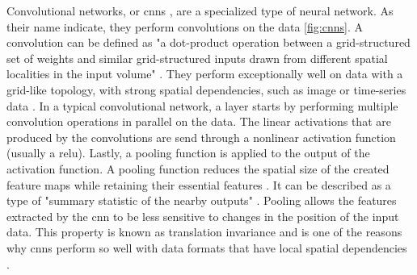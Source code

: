 Convolutional networks, or \glspl{cnn} \cite{lecun1998GradientbasedLearningApplied}, are a specialized type of neural network.
As their name indicate, they perform convolutions on the data \autoref{fig:cnns}.
A convolution can be defined as "a dot-product operation between a grid-structured set of weights and similar grid-structured inputs drawn from
different spatial localities in the input volume" \cite[p. 316]{aggarwal2018NeuralNetworksDeep}.
They perform exceptionally well on data with a grid-like topology, with strong spatial dependencies, such as image or time-series data \cite{aggarwal2018NeuralNetworksDeep, Goodfellow-et-al-2016}.
In a typical convolutional network, a layer starts by performing multiple convolution operations in parallel on the data.
The linear activations that are produced by the convolutions are send through a nonlinear activation function (usually a \gls{relu}).
Lastly, a pooling function is applied to the output of the activation function.
A pooling function reduces the spatial size of the created feature maps while retaining their essential features \cite{Goodfellow-et-al-2016, aggarwal2018NeuralNetworksDeep}.
It can be described as a type of "summary statistic of the nearby outputs" \cite[p. 335]{Goodfellow-et-al-2016}.
Pooling allows the features extracted by the \gls{cnn} to be less sensitive to changes in the position of the input data.
This property is known as translation invariance and is one of the reasons why \glspl{cnn} perform so well with data formats that have local spatial dependencies \cite{Goodfellow-et-al-2016, aggarwal2018NeuralNetworksDeep}.

